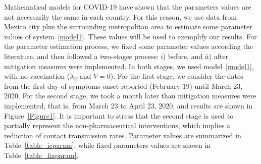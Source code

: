 \noindent Mathematical models for COVID-19 have shown that the parameters values are not necessarily the same in each country. For this reason, we use data from Mexico city plus the surrounding metropolitan area to estimate some parameter values of system~\ref{model1}. These values will be used to exemplify our results. For the parameter estimation process, we fixed some parameter values according the literature, and then followed a two-stages process: i) before, and ii) after mitigation measures were implemented. In both stages, we used model~\ref{model1}, with no vaccination ($\lambda_V$ and $V = 0$). For the first stage, we consider the dates from the first day of symptoms onset reported (February 19) until March 23, 2020. For the second stage, we took a month later than mitigation measures were implemented, that is, from March 23 to April 23, 2020, and results are shown in Figure~\ref{Figure1}. It is important to stress that the second stage is used to partially represent the non-pharmaceutical interventions, which implies a reduction of contact transmission rates. Parameter values are summarized in Table~\ref{table_icparam}, while fixed parameters values are shown in Table~\ref{table_fixparam}.





